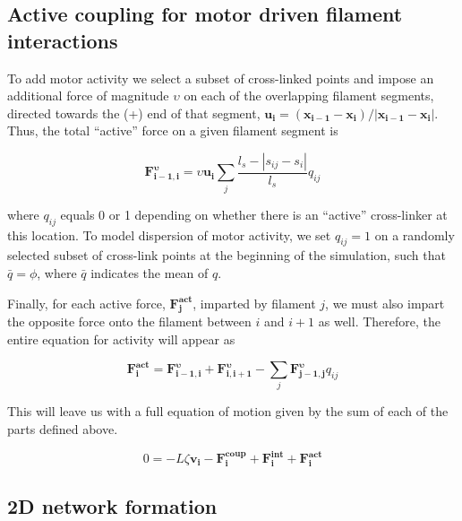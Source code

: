 \subsection{Active coupling for motor driven filament interactions}

To add motor activity we select a subset of cross-linked points and impose an additional force of magnitude $\upsilon$ on each of the overlapping filament segments, directed towards the (+) end of that segment, $\mathbf{u_i}=(\mathbf{x_{i-1}}-\mathbf{x_{i}})/|\mathbf{x_{i-1}}-\mathbf{x_{i}}|$. Thus, the total ``active'' force on a given filament segment is

\begin{equation}
\label{eqn:moto}
\mathbf{F^{\upsilon}_{i-1,i}}=\upsilon \mathbf{u_i}\sum_j \frac{l_s-|s_{ij}-s_i|}{l_s}q_{ij}
\end{equation}

where $q_{ij}$ equals 0 or 1 depending on whether there is an ``active'' cross-linker at this location. To model dispersion of motor activity, we set $q_{ij}=1$  on a randomly selected subset of cross-link points at the beginning of the simulation, such that $\bar{q}=\phi$, where $\bar{q}$ indicates the mean of $q$.  



Finally, for each active force, $\mathbf{F^{act}_j}$, imparted by filament $j$, we must also impart the opposite force onto the filament between $i$ and $i+1$ as well.  Therefore, the entire equation for activity will appear as

\begin{equation}
\label{eqn:active}
\mathbf{F^{act}_{i}}=\mathbf{F^{\upsilon}_{i-1,i}} + \mathbf{F^{\upsilon}_{i,i+1}}
- \sum_{j}\mathbf{F^{\upsilon}_{j-1,j}}q_{ij}
\end{equation}


This will leave us with a full equation of motion given by the sum of each of the parts defined above.

\begin{equation}
\label{eqn:syst3}
0=-L\zeta\mathbf{ v_i} -\mathbf{F^{coup}_i}+ \mathbf{F^{int}_i}+\mathbf{F^{act}_i} 
\end{equation}

\subsection{2D network formation}

